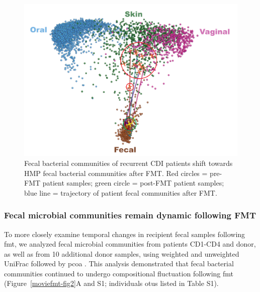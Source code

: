\begin{figure}[htbp]
\includegraphics[width=\columnwidth]{moviefmt-figures/figure-1}
\caption[Fecal bacterial communities of recurrent CDI patients shift towards HMP fecal bacterial communities after FMT.]{Fecal bacterial communities of recurrent CDI patients shift towards HMP fecal bacterial communities after FMT. Red circles = pre-FMT patient samples; green circle = post-FMT patient samples; blue line = trajectory of patient fecal communities after FMT.}
\label{moviefmt-fig1}
\end{figure}

\subsubsection{Fecal microbial communities remain dynamic following FMT}
To more closely examine temporal changes in recipient fecal samples following \gls{fmt}, we analyzed fecal microbial communities from patients CD1-CD4 and donor, as well as from 10 additional donor samples, using weighted and unweighted UniFrac \cite{RN83} followed by \gls{pcoa} \cite{RN110}. This analysis demonstrated that fecal bacterial communities continued to undergo compositional fluctuation following \gls{fmt} (Figure~\ref{moviefmt-fig2}A and S1; individuals \glspl{otu} listed in Table S1).

